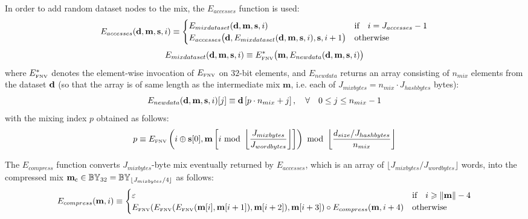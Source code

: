 In order to add random dataset nodes to the mix, the $E_{accesses}$ function is used:
\begin{equation}
 	E_{accesses}(\mathbf{d}, \mathbf{m}, \mathbf{s}, i) 
 	\equiv 
 	\begin{cases}
		E_{mixdataset}(\mathbf{d}, \mathbf{m},  \mathbf{s}, i) & \text{if} \quad i = J_{accesses} -1 \\
		E_{accesses}\big(\mathbf{d}, E_{mixdataset}(\mathbf{d}, \mathbf{m}, \mathbf{s}, i), \mathbf{s}, i + 1\big) & \text{otherwise}
	\end{cases}
\end{equation}
\begin{equation}
 E_{mixdataset}(\mathbf{d}, \mathbf{m}, \mathbf{s}, i) \equiv E_\text{\tiny FNV}^*\big(\mathbf{m}, E_{newdata}(\mathbf{d}, \mathbf{m}, \mathbf{s}, i)\big)
\end{equation}
where $E_\text{\tiny FNV}^*$ denotes the element-wise invocation of $E_\text{\tiny FNV}$ on $32$-bit elements,
and $E_{newdata}$ returns an array consisting of $n_{mix}$ elements from the dataset $\mathbf{d}$ (so that the array is of same length as the intermediate mix $\mathbf{m}$, i.e. each of $J_{mixbytes} = n_{mix}\cdot J_{hashbytes}$ bytes):
\begin{equation}
 	E_{newdata}(\mathbf{d}, \mathbf{m}, \mathbf{s}, i)[j] 
 	\equiv \mathbf{d}\left[ {p} \cdot n_{mix} + j\right], \quad \forall \quad 0\le j \le n_{mix}-1
\end{equation}
with the mixing index ${p}$ obtained as follows:
\begin{equation}
	{p} \equiv 
	E_\text{\tiny FNV}\left(i \oplus \mathbf{s}[0], \mathbf{m}\left[i \mbox{ mod } \left\lfloor\frac{J_{mixbytes}}{J_{wordbytes}}\right\rfloor\right]\right) \mbox{ mod } \left\lfloor\frac{d_{size} / J_{hashbytes}}{n_{mix}}\right\rfloor
\end{equation}

The $E_{compress}$ function converts $J_{mixbytes}$-byte mix eventually returned by $E_{accesses}$, 
which is an array of $\lfloor J_{mixbytes} / J_{wordbytes} \rfloor$ words,
into the compressed mix $\mathbf{m}_{\mathrm{c}} \in \mathbb{BY}_{32}=\mathbb{BY}_{\lfloor J_{mixbytes}/4 \rfloor}$ as follows:
\begin{equation}
	E_{compress}(\mathbf{m}, i) \equiv 
	\begin{cases}
		\mathbb{\varepsilon} & \text{if} \quad i \geqslant \lVert \mathbf{m} \rVert - 4 \\
		E_\text{\tiny FNV}(E_\text{\tiny FNV}(E_\text{\tiny FNV}(\mathbf{m}[i], \mathbf{m}[i + 1]), \mathbf{m}[i + 2]), \mathbf{m}[i + 3]) 
		\circ E_{compress}(\mathbf{m}, i + 4) & \text{otherwise}
	\end{cases}
\end{equation}

